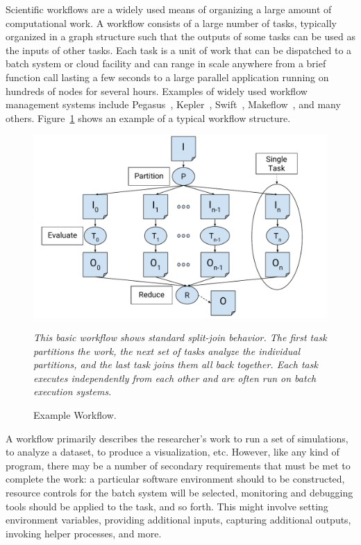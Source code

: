 \documentclass[conference]{IEEEtran}
\begin{document}
Scientific workflows are a widely used means of organizing
a large amount of computational work.  A workflow consists
of a large number of tasks, typically organized in a graph structure
such that the outputs of some tasks can be used as the inputs 
of other tasks.  Each task is a unit of work that can be dispatched
to a batch system or cloud facility and can range in scale anywhere
from a brief function call lasting a few seconds to a large parallel
application running on hundreds of nodes for several hours.
Examples of widely used workflow management systems include
Pegasus~\cite{pegasus}, 
Kepler~\cite{doi:10.1002-cpe.94}, 
Swift~\cite{swift}, 
Makeflow~\cite{makeflow-sweet12}, and many others. Figure~\ref{fig:workflow} shows an example of a typical
workflow structure.

\begin{figure}[t]
\includegraphics[width=\columnwidth]{graphics/example_workflow.pdf}
\caption{Example Workflow.}
\small
\emph{This basic workflow shows
standard split-join behavior. The first task partitions the work, the next set of tasks analyze the individual 
partitions, and the last task joins them all back 
together. Each task executes independently from each other
and are often run on batch execution systems.}
\label{fig:workflow}
\end{figure}


A workflow primarily describes the researcher's work
to run a set of simulations, 
to analyze a dataset, 
to produce a visualization, etc.
However, like any kind of program, there may be a number of secondary
requirements that must be met to complete the work:
a particular software environment should to be constructed,
resource controls for the batch system will be selected,
monitoring and debugging tools should be applied to the task,
and so forth.  This might involve  
setting environment variables,
providing additional inputs, capturing additional outputs,
invoking helper processes, and more.
\end{document}
